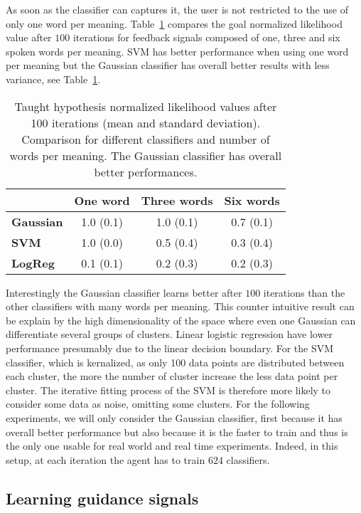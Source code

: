 As soon as the classifier can captures it, the user is not restricted to the use of only one word per meaning. Table~\ref{tab:1} compares the goal normalized likelihood value after $100$ iterations for feedback signals composed of one, three and six spoken words per meaning. SVM has better performance when using one word per meaning but the Gaussian classifier has overall better results with less variance, see Table~\ref{tab:1}. 

\begin{table}[!htbp]
\centering
\begin{tabular}{|l|c|c|c|}
\hline
&\textbf{One word}&\textbf{Three words}&\textbf{Six words}\\\hline
\textbf{Gaussian}&1.0 (0.1)&1.0 (0.1)&0.7 (0.1)\\\hline
\textbf{SVM}&1.0 (0.0)&0.5 (0.4)&0.3 (0.4)\\\hline
\textbf{LogReg}&0.1 (0.1)&0.2 (0.3)&0.2 (0.3)\\\hline
\end{tabular}
\caption{Taught hypothesis normalized likelihood values after 100 iterations (mean and standard deviation). Comparison for different classifiers and number of words per meaning. The Gaussian classifier has overall better performances.}
\label{tab:1}
\end{table}

Interestingly the Gaussian classifier learns better after $100$ iterations than the other classifiers with many words per meaning. This counter intuitive result can be explain by the high dimensionality of the space where even one Gaussian can differentiate several groups of clusters. Linear logistic regression have lower performance presumably due to the linear decision boundary. For the SVM classifier, which is kernalized, as only 100 data points are distributed between each cluster, the more the number of cluster increase the less data point per cluster. The iterative fitting process of the SVM is therefore more likely to consider some data as noise, omitting some clusters. For the following experiments, we will only consider the Gaussian classifier, first because it has overall better performance but also because it is the faster to train and thus is the only one usable for real world and real time experiments. Indeed, in this setup, at each iteration the agent has to train $624$ classifiers.

\subsection{Learning guidance signals}


